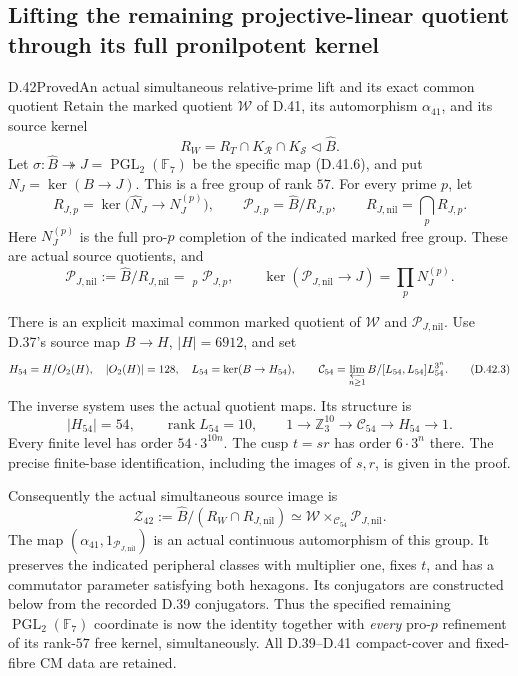 \subsection{Lifting the remaining projective-linear quotient through its full pronilpotent kernel}

\begin{statement}{D.42}{Proved}{An actual simultaneous relative-prime lift and its exact common quotient}
Retain the marked quotient $\mathcal W$ of D.41, its
automorphism $\alpha_{41}$, and its source kernel
\[
 R_W=R_T\cap K_{\mathcal R}\cap K_{\mathcal S}
       \lhd\widehat B .
\]
Let $\sigma:\widehat B\twoheadrightarrow
J=\operatorname{PGL}_2(\mathbb F_7)$ be the specific
map (D.41.6), and put $N_J=\ker(B\to J)$.
This is a free group of rank $57$. For every prime $p$,
let
\[
 R_{J,p}=\ker\bigl(\widehat N_J\longrightarrow
                              N_J^{(p)}\bigr),\qquad
 \mathcal P_{J,p}=\widehat B/R_{J,p},\qquad
 R_{J,\mathrm{nil}}=\bigcap_pR_{J,p}.                    \tag{D.42.1}
\]
Here $N_J^{(p)}$ is the full pro-$p$ completion of the
indicated marked free group. These are actual source
quotients, and
\[
 \mathcal P_{J,\mathrm{nil}}
   :=\widehat B/R_{J,\mathrm{nil}}
    =\mathop{\prod_J}_{p}\mathcal P_{J,p},\qquad
 \ker(\mathcal P_{J,\mathrm{nil}}\to J)
    =\prod_p N_J^{(p)}.                                \tag{D.42.2}
\]

There is an explicit maximal common marked quotient
of $\mathcal W$ and $\mathcal P_{J,\mathrm{nil}}$.
Use D.37's source map $B\to H$, $|H|=6912$, and set
\[
 H_{54}=H/O_2(H),\quad |O_2(H)|=128,\quad
 L_{54}=\ker(B\to H_{54}),\qquad
 \mathcal C_{54}
   =\varprojlim_{n\ge1}B/[L_{54},L_{54}]L_{54}^{3^n}.
                                                               \tag{D.42.3}
\]
The inverse system uses the actual quotient maps.
Its structure is
\[
 |H_{54}|=54,\qquad
 \operatorname{rank}L_{54}=10,\qquad
 1\longrightarrow\mathbb Z_3^{10}
  \longrightarrow\mathcal C_{54}
  \longrightarrow H_{54}\longrightarrow1.             \tag{D.42.4}
\]
Every finite level has order $54\cdot3^{10n}$.
The cusp $t=sr$ has order $6\cdot3^n$ there.
The precise finite-base identification, including the
images of $s,r$, is given in the proof.

Consequently the actual simultaneous source image is
\[
 \mathcal Z_{42}
   :=\widehat B/(R_W\cap R_{J,\mathrm{nil}})
     \simeq
     \mathcal W\mathbin{\times_{\mathcal C_{54}}}
                         \mathcal P_{J,\mathrm{nil}}.  \tag{D.42.5}
\]
The map $(\alpha_{41},1_{\mathcal P_{J,\mathrm{nil}}})$
is an actual continuous automorphism of this group.
It preserves the indicated peripheral classes with
multiplier one, fixes $t$, and has a commutator
parameter satisfying both hexagons. Its conjugators
are constructed below from the recorded D.39
conjugators. Thus the specified remaining
$\operatorname{PGL}_2(\mathbb F_7)$ coordinate is now
the identity together with \emph{every} pro-$p$
refinement of its rank-$57$ free kernel, simultaneously.
All D.39--D.41 compact-cover and fixed-fibre CM data
are retained.


\end{statement}
